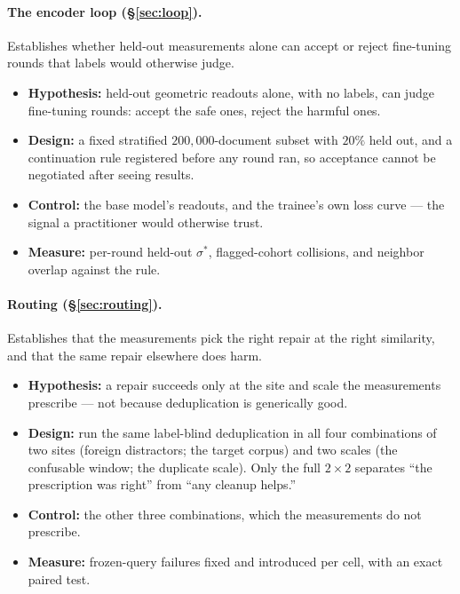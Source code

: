 \documentclass[11pt,letterpaper]{article}
\newcommand{\sstar}{\sigma^{*}}
\begin{document}
\paragraph{The encoder loop (\S\ref{sec:loop}).}
Establishes whether held-out measurements alone can accept or reject
fine-tuning rounds that labels would otherwise judge.
\begin{itemize}
  \item \textbf{Hypothesis:} held-out geometric readouts alone, with no labels, can judge
fine-tuning rounds: accept the safe ones, reject the harmful ones.
  \item \textbf{Design:} a fixed
stratified $200{,}000$-document subset with $20\%$ held out, and a
continuation rule registered before any round ran, so acceptance cannot
be negotiated after seeing results.
  \item \textbf{Control:} the base model's readouts, and the trainee's own loss
curve --- the signal a practitioner would otherwise trust.
  \item \textbf{Measure:} per-round held-out $\sstar$, flagged-cohort
collisions, and neighbor overlap against the rule.
\end{itemize}


\paragraph{Routing (\S\ref{sec:routing}).}
Establishes that the measurements pick the right repair at the right
similarity, and that the same repair elsewhere does harm.
\begin{itemize}
  \item \textbf{Hypothesis:} a repair succeeds only
at the site and scale the measurements prescribe --- not because
deduplication is generically good.
  \item \textbf{Design:} run the same label-blind deduplication in all four combinations of two
sites (foreign distractors; the target corpus) and two scales (the
confusable window; the duplicate scale). Only the full $2 \times 2$
separates ``the prescription was right'' from ``any cleanup helps.''
  \item \textbf{Control:} the other three combinations, which the
measurements do not prescribe.
  \item \textbf{Measure:} frozen-query failures
fixed and introduced per cell, with an exact paired test.
\end{itemize}

\end{document}
